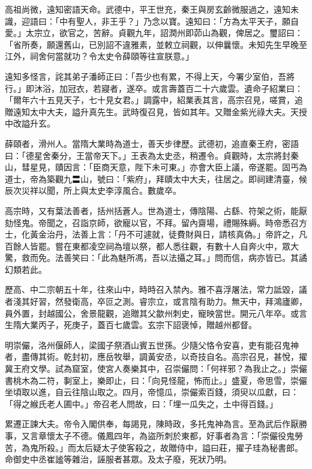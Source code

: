 \begin{pinyinscope}
 高祖尚微，遠知密語天命。武德中，平王世充，秦王與房玄齡微服過之，遠知未識，迎語曰：「中有聖人，非王乎？」乃念以寶。遠知曰：「方為太平天子，願自愛。」太宗立，欲官之，苦辭。貞觀九年，詔潤州即茆山為觀，俾居之。璽詔曰：「省所奏，願還舊山，已別詔不違雅素，並敕立祠觀，以伸曩懷。未知先生早晚至江外，祠舍何當就功？令太史令薛頤等往宣朕意。」



 遠知多怪言，詫其弟子潘師正曰：「吾少也有累，不得上天，今署少室伯，吾將行。」即沐浴，加冠衣，若寢者，遂卒。或言壽蓋百二十六歲雲。遺命子紹業曰：「爾年六十五見天子，七十見女君。」調露中，紹業表其言，高宗召見，嗟賞，追贈遠知太中大夫，謚升真先生。武時復召見，皆如其年。又贈金紫光祿大夫。天授中改謚升玄。



 薛頤者，滑州人。當隋大業時為道士，善天步律歷。武德初，追直秦王府，密語曰：「德星舍秦分，王當帝天下。」王表為太史丞，稍遷令。貞觀時，太宗將封秦山，彗星見，賾因言：「臣商天意，陛下未可東。」亦會大臣上議，帝遂罷。固丐為道士，帝為築觀九〓山，號曰：「紫府」，拜賾太中大夫，往居之。即祠建清臺，候辰次災祥以聞，所上與太史李淳風合。數歲卒。



 高宗時，又有葉法善者，括州括蒼人。世為道士，傳陰陽、占繇、符架之術，能厭劾怪鬼。帝聞之，召詣京師，欲寵以官，不拜。留內齋場，禮賜殊縟。時帝悉召方士，化黃金治丹，法善上言：「丹不可遽就，徒費財與日，請核真偽。」帝許之，凡百餘人皆罷。嘗在東都凌空祠為壇以祭，都人悉往觀，有數十人自奔火中，眾大驚，救而免。法善笑曰：「此為魅所馮，吾以法攝之耳。」問而信，病亦皆已。其譎幻類若此。



 歷高、中二宗朝五十年，往來山中，時時召入禁內。雅不喜浮屠法，常力詆毀，議者淺其好習，然發衛高，卒叵之測。睿宗立，或言陰有助力。無天中，拜鴻廬卿，員外置，封越國公，舍景龍觀，追贈其父歙州刺史，寵映當世。開元八年卒。或言生隋大業丙子，死庚子，蓋百七歲雲。玄宗下詔褒悼，贈越州都督。



 明崇儼，洛州偃師人，梁國子祭酒山賓五世孫。少隨父恪令安喜，吏有能召鬼神者，盡傳其術。乾封初，應岳牧舉，調黃安丞，以奇技自名。高宗召見，甚悅，擢冀王府文學。試為窟室，使宮人奏樂其中，召崇儼問：「何祥邪？為我止之。」崇儼書桃木為二符，剚室上，樂即止，曰：「向見怪龍，怖而止。」盛夏，帝思雪，崇儼坐頃取以進，自云往陰山取之。四月，帝憶瓜，崇儼索百錢，須臾以瓜獻，曰：「得之緱氏老人圃中。」帝召老人問故，曰：「埋一瓜失之，土中得百錢。」



 累遷正諫大夫。帝令入閣供奉，每謁見，陳時政，多托鬼神為言。至為武后作厭勝事，又言章懷太子不德。儀鳳四年，為盜所刺於東都，好事者為言：「崇儼役鬼勞苦，為鬼所殺。」而太后疑太子使客殺之，故贈侍中，謚曰莊，擢子珪為秘書郎。命御史中丞崔謐等雜治，誣服者甚眾。及太子廢，死狀乃明。




\end{pinyinscope}

